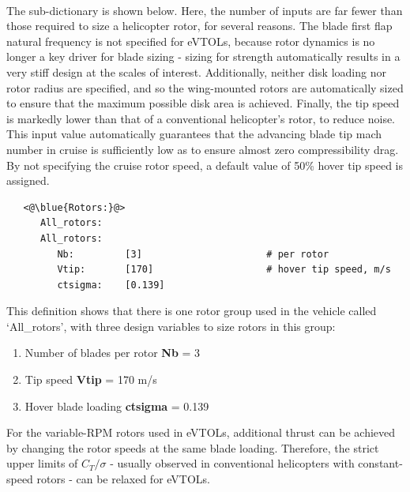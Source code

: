 \paragraph{}
The  sub-dictionary is shown below. Here, the number of inputs are far fewer than those required to size a helicopter rotor, for several reasons. The blade first flap natural frequency is not specified for eVTOLs, because rotor dynamics is no longer a key driver for blade sizing - sizing for strength automatically results in a very stiff design at the scales of interest. Additionally, neither disk loading nor rotor radius are specified, and so the wing-mounted rotors are automatically sized to ensure that the maximum possible disk area is achieved. Finally, the tip speed is markedly lower than that of a conventional helicopter's rotor, to reduce noise. This input value automatically guarantees that the advancing blade tip mach number in cruise is sufficiently low as to ensure almost zero compressibility drag. By not specifying the cruise rotor speed, a default value of 50\% hover tip speed is assigned. 

\begin{lstlisting}
   <@\blue{Rotors:}@>
      All_rotors:
      All_rotors:
         Nb:         [3]                      # per rotor
         Vtip:       [170]                    # hover tip speed, m/s
         ctsigma:    [0.139]
\end{lstlisting}
This definition shows that there is one rotor group used in the vehicle called `All\_rotors', with three design variables to size rotors in this group:
\begin{enumerate}
\item Number of blades per rotor \textbf{Nb} = 3
\item Tip speed \textbf{Vtip} = 170 m/s
\item Hover blade loading \textbf{ctsigma} = 0.139
\end{enumerate}
For the variable-RPM rotors used in eVTOLs, additional thrust can be achieved by changing the rotor speeds at the same blade loading. Therefore, the strict upper limits of $C_T/\sigma$ - usually observed in conventional helicopters with constant-speed rotors - can be relaxed for eVTOLs. 

